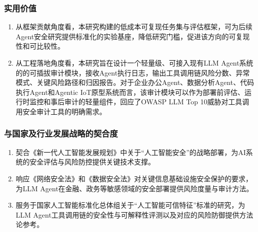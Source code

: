 \subsubsection{实用价值}

\begin{enumerate}
  \item 从框架贡献角度看，本研究构建的低成本可复现任务集与评估框架，可为后续Agent安全研究提供标准化的实验基座，降低研究门槛，促进该方向的可复现性和可比较性。

  \item 从工程落地角度看，本研究旨在设计一个轻量级、可接入现有LLM Agent系统的的可插拔审计模块，接收Agent执行日志，输出工具调用链风险分数、异常模式、关键风险路径和归因报告。对于企业办公Agent、数据分析Agent、代码执行Agent和Agentic IoT原型系统而言，该审计模块可以作为部署前评估、运行时监控和事后审计的轻量组件，回应了OWASP LLM Top 10威胁\cite{owasp2025llmtop10}对工具调用安全审计工具的明确需求。
\end{enumerate}

\subsubsection{与国家及行业发展战略的契合度}

\begin{enumerate}
  \item 契合《新一代人工智能发展规划》中关于“人工智能安全”的战略部署，为AI系统的安全评估与风险防控提供关键技术支撑。
  \item 响应《网络安全法》和《数据安全法》对关键信息基础设施安全保护的要求，为LLM Agent在金融、政务等敏感领域的安全部署提供风险度量与审计方法。
  \item 服务于国家人工智能标准化总体组关于“人工智能可信特征”标准的研究，为LLM Agent工具调用链的安全性与可解释性评测以及对应的风险防御提供方法论参考。
\end{enumerate}
